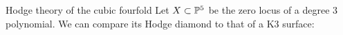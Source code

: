 \documentclass[10pt]{beamer}
\begin{document}
\begin{frame}[fragile]{Hodge theory of the cubic fourfold}
    Let $X\subset \P^5$ be the zero locus of a degree $3$ polynomial. We can compare its Hodge diamond to that of a K3 surface: 

                                

\end{frame}
\end{document}
